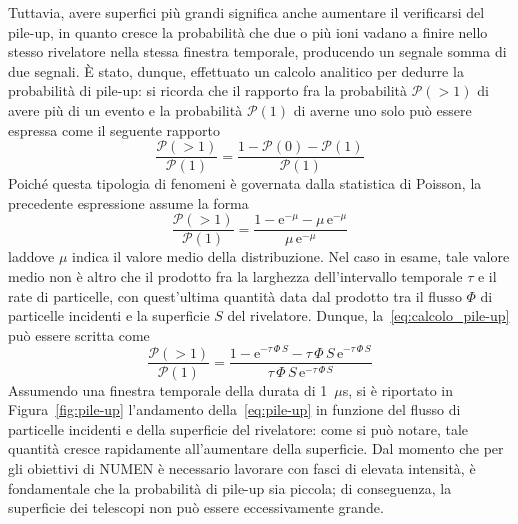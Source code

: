 Tuttavia, avere superfici più grandi significa anche aumentare il verificarsi del pile-up, in quanto cresce la probabilità che due o più ioni vadano a finire nello stesso rivelatore nella stessa finestra temporale, producendo un segnale somma di due segnali.
È stato, dunque, effettuato un calcolo analitico per dedurre la probabilità di pile-up: si ricorda che il rapporto fra la probabilità $\mathcal{P}(> \! 1)$ di avere più di un evento e la probabilità $\mathcal{P}(1)$ di averne uno solo può essere espressa come il seguente rapporto
\begin{equation}
	\frac{\mathcal{P}(> \! 1)}{\mathcal{P}(1)} = \frac{1 - 
	\mathcal{P}(0) - \mathcal{P}(1)}{\mathcal{P}(1)}
\end{equation}
Poiché questa tipologia di fenomeni è governata dalla statistica di Poisson, la precedente espressione assume la forma
\begin{equation}
\frac{\mathcal{P}(> \! 1)}{\mathcal{P}(1)} = \frac{1 - 
	\mbox{e}^{-\mu} - \mu \,\mbox{e}^{- \mu}}{\mu \, \mbox{e}^{- \mu}}
\end{equation} \label{eq:calcolo_pile-up}
laddove $\mu$ indica il valore medio della distribuzione.
Nel caso in esame, tale valore medio non è altro che il prodotto fra la larghezza dell'intervallo temporale $\tau$ e il rate di particelle, con quest'ultima quantità data dal prodotto tra il flusso $\Phi$ di particelle incidenti e la superficie $S$ del rivelatore.
Dunque, la~\ref{eq:calcolo_pile-up} può essere scritta come
\begin{equation}
\frac{\mathcal{P}(> \! 1)}{\mathcal{P}(1)} = \frac{1 - 
	\mbox{e}^{- \tau \, \Phi \, S} - \tau \, \Phi \, S \,\mbox{e}^{- \tau\, \Phi \, S}}{\tau \, \Phi \, S \, \mbox{e}^{- \tau \, \Phi \, S}}
\end{equation} \label{eq:pile-up}
Assumendo una finestra temporale della durata di 1~$\mu$s, si è riportato in Figura~\ref{fig:pile-up} l'andamento della~\ref{eq:pile-up} in funzione del flusso di particelle incidenti e della superficie del rivelatore: come si può notare, tale quantità cresce rapidamente all'aumentare della superficie.
Dal momento che per gli obiettivi di NUMEN è necessario lavorare con fasci di elevata intensità, è fondamentale che la probabilità di pile-up sia piccola; di conseguenza, la superficie dei telescopi non può essere eccessivamente grande.


